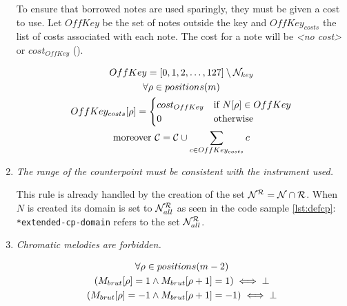 \begin{enumerate}[wide, label=\bfseries G\arabic*]
    To ensure that borrowed notes are used sparingly, they must be given a cost to use. Let $OffKey$ be the set of notes outside the key and $OffKey_{costs}$ the list of costs associated with each note. The cost for a note will be \textit{<no cost>} or $cost_{OffKey}$ ().

    \begin{equation}
        \begin{gathered}
            OffKey = [0, 1, 2, \dots, 127] \setminus \mathcal{N}_{key}\\
            \forall \rho \in positions(m)\\
            OffKey_{costs}[\rho] = \begin{cases}
                cost_{OffKey} & \text{if } N[\rho] \in OffKey \\
                0 & \text{otherwise}
            \end{cases}\\
            \text{moreover } \mathcal{C} = \mathcal{C} \cup \sum _{c \in OffKey_{costs}} c
        \end{gathered}
    \end{equation}

    \item \textit{The range of the counterpoint must be consistent with the instrument used.} \label{rule:instrurange}

    This rule is already handled by the creation of the set $\mathcal{N}^{\mathcal{R}} = \mathcal{N} \cap \mathcal{R}$. When $N$ is created its domain is set to $\mathcal{N}_{all}^{\mathcal{R}}$ as seen in the code sample \ref{lst:defcp}: \texttt{*extended-cp-domain} refers to the set $\mathcal{N}_{all}^{\mathcal{R}}$.

    \item \textit{Chromatic melodies are forbidden.}\label{rule:chromafb}

    \begin{equation}
        \begin{gathered}
            \forall \rho \in positions(m-2)\\
            (M_{brut}[\rho] = 1 \land M_{brut}[\rho+1] = 1) \iff \bot\\
            (M_{brut}[\rho] = -1 \land M_{brut}[\rho+1] = -1) \iff \bot\\
        \end{gathered}
    \end{equation}
    

\end{enumerate}
